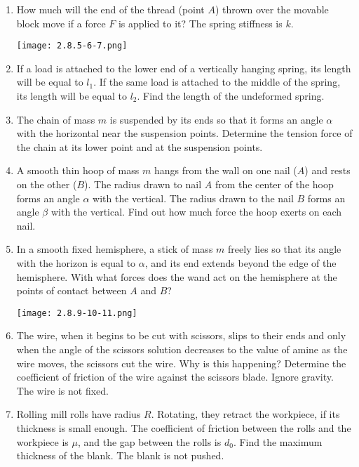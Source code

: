 \documentclass{article}
\begin{document}
\begin{enumerate}[label=2.8.\arabic*]
\item How much will the end of the thread (point $A$) thrown over the movable block move if a force $F$ is applied to it? The spring stiffness is $k$.

\begin{center}
    \texttt{[image: 2.8.5-6-7.png]}
\end{center}

\item If a load is attached to the lower end of a vertically hanging spring, its length will be equal to $l_1$. If the same load is attached to the middle of the spring, its length will be equal to $l_2$. Find the length of the undeformed spring.

\item The chain of mass $m$ is suspended by its ends so that it forms an angle $\alpha$ with the horizontal near the suspension points. Determine the tension force of the chain at its lower point and at the suspension points.

\item A smooth thin hoop of mass $m$ hangs from the wall on one nail ($A$) and rests on the other ($B$). The radius drawn to nail $A$ from the center of the hoop forms an angle $\alpha$ with the vertical. The radius drawn to the nail $B$ forms an angle $\beta$ with the vertical. Find out how much force the hoop exerts on each nail.

\item In a smooth fixed hemisphere, a stick of mass $m$ freely lies so that its angle with the horizon is equal to $\alpha$, and its end extends beyond the edge of the hemisphere. With what forces does the wand act on the hemisphere at the points of contact between $A$ and $B$?

\begin{center}
    \texttt{[image: 2.8.9-10-11.png]}
\end{center}

\item The wire, when it begins to be cut with scissors, slips to their ends and only when the angle of the scissors solution decreases to the value of amine as the wire moves, the scissors cut the wire. Why is this happening? Determine the coefficient of friction of the wire against the scissors blade. Ignore gravity. The wire is not fixed.

\item Rolling mill rolls have radius $R$. Rotating, they retract the workpiece, if its thickness is small enough. The coefficient of friction between the rolls and the workpiece is $\mu$, and the gap between the rolls is $d_0$. Find the maximum thickness of the blank. The blank is not pushed.


\end{enumerate}
\end{document}
